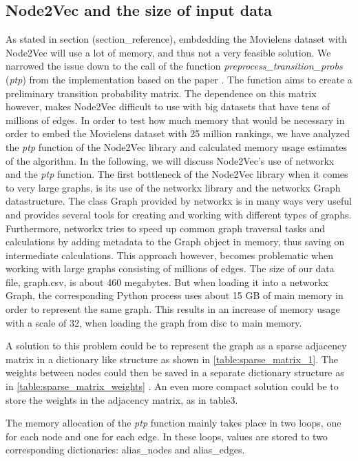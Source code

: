 \subsection{Node2Vec and the size of input data}\label{AP:N2V}
As stated in section (section\_reference), embdedding the Movielens dataset with Node2Vec will use a lot of memory, and thus not a very feasible solution. We narrowed the issue down to the call of the function  \textit{preprocess\_transition\_probs} (\textit{ptp}) from the implementation based on the paper \cite{Node2vec}. The function aims to create a preliminary transition probability matrix. The dependence on this matrix however, makes Node2Vec difficult to use with big datasets that have tens of millions of edges. In order to test how much memory that would be necessary in order to embed the Movielens dataset with 25 million rankings, we have analyzed the \textit{ptp} function of the Node2Vec library and calculated memory usage estimates of the algorithm. In the following, we will discuss Node2Vec's use of networkx and the \textit{ptp} function.
The first bottleneck of the Node2Vec library when it comes to very large graphs, is its use of the networkx library and the networkx Graph datastructure.
The class Graph provided by networkx is in many ways very useful and provides several tools for creating and working with different types of graphs. Furthermore, networkx tries to speed up common graph traversal tasks and calculations by adding metadata to the Graph object in memory, thus saving on intermediate calculations.
This approach however, becomes problematic when working with large graphs consisting of millions of edges. The size of our data file, graph.csv, is about 460 megabytes. But when loading it into a networkx Graph, the corresponding Python process uses about 15 GB of main memory in order to represent the same graph. This results in an increase of memory usage with a scale of 32, when loading the graph from disc to main memory.

A solution to this problem could be to represent the graph as a sparse adjacency matrix  in a dictionary like structure as shown in \autoref{table:sparse_matrix_1}. The weights between nodes could then be saved in a separate dictionary structure as in \autoref{table:sparse_matrix_weights} . An even more compact solution could be to store the weights in the adjacency matrix, as in table3.






The memory allocation of the \textit{ptp} function mainly takes place in two loops, one for each node and one for each edge. In these loops, values are stored to two corresponding dictionaries: alias\_nodes and alias\_edges.
